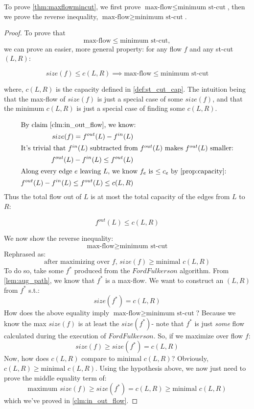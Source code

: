 \documentclass{article}
\theoremstyle{definition}
\begin{document}
To prove \ref{thm:maxflowmincut}, we first prove $\text{max-flow} \leq \text{minimum st-cut}$, then we prove the reverse inequality, $\text{max-flow} \geq \text{minimum st-cut}$.

\begin{proof}
	To prove that $$\text{max-flow} \leq \text{minimum st-cut},$$ we can prove an easier, more general property: for any flow $f$ and any st-cut $(L,R)$:
	
	$$size(f) \leq c(L,R) \implies \text{max-flow} \leq \text{minimum st-cut}$$
	
	where, $c(L,R)$ is the capacity defined in \ref{def:st_cut_cap}. The intuition being that the max-flow of $size(f)$ is just a special case of some $size(f)$, and that the minimum $c(L,R)$ is just a special case of finding some $c(L,R)$.
	
	\begin{align*}
		\shortintertext{By claim \ref{clm:in_out_flow}, we know:}
		size(f) = f^{out} (L) - f^{in} (L)\\
		\shortintertext{It's trivial that $f^{in}(L)$ subtracted from $f^{out}(L)$ makes $f^{out}(L)$ smaller:}
		f^{out} (L) - f^{in} (L) \leq f^{out}(L)\\
		\shortintertext{Along every edge $e$ leaving $L$, we know $f_e$ is $\leq c_e$ by \ref{prop:capacity}:} 
		f^{out} (L) - f^{in} (L) \leq f^{out}(L) \leq c(L,R)
	\end{align*}
	Thus the total flow out of $L$ is at most the total capacity of the edges from $L$ to $R$:

	$$f^{out}(L) \leq c(L,R)$$

	We now show the reverse inequality:
	$$\text{max-flow} \geq \text{minimum st-cut}$$
	Rephrased as:
	$$\text{after maximizing over $f$, } size(f) \geq \text{minimal }c(L,R)$$
	To do so, take some $f^*$ produced from the $FordFulkerson$ algorithm. From \ref{lem:aug_path}, we know that $f^*$ is a max-flow. We want to construct an $(L,R)$ from $f^*$ s.t.:
	$$size(f^*) = c(L,R)$$
	How does the above equality imply $\text{max-flow} \geq \text{minimum st-cut}$? Because we know the max $size(f)$ is at least the $size(f^*)$- note that $f^*$ is just \textit{some} flow calculated during the execution of $FordFulkerson$. 
	So, if we maximize over flow $f$:
	$$size(f) \geq size(f^*) = c(L,R)$$
	Now, how does $c(L,R)$ compare to $\text{minimal }c(L,R)$? Obviously, $c(L,R) \geq \text{minimal }c(L,R)$.
	Using the hypothesis above, we now just need to prove the middle equality term of:
	$$\text{maximum } size(f) \geq size(f^*) = c(L,R) \geq \text{minimal }c(L,R)$$
	which we've proved in \ref{clm:in_out_flow}.
\end{proof}
\end{document}

